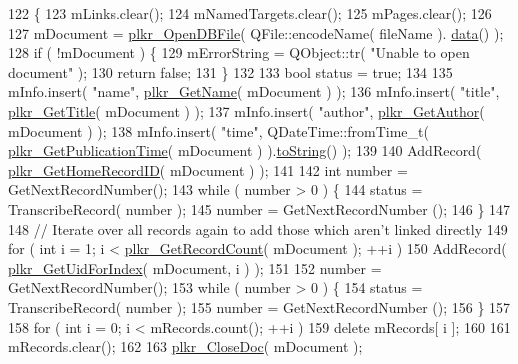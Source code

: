 \begin{DoxyCode}
122 \{
123     mLinks.clear();
124     mNamedTargets.clear();
125     mPages.clear();
126 
127     mDocument = \hyperlink{unpluck_8cpp_a38de1e8e97b764ccca414cf11e08dc61}{plkr\_OpenDBFile}( QFile::encodeName( fileName ).
      \hyperlink{structdrawinf_af73f66288002f0a25c7843a534bf1340}{data}() );
128     \textcolor{keywordflow}{if} ( !mDocument ) \{
129         mErrorString = QObject::tr( \textcolor{stringliteral}{"Unable to open document"} );
130         \textcolor{keywordflow}{return} \textcolor{keyword}{false};
131     \}
132 
133     \textcolor{keywordtype}{bool} status = \textcolor{keyword}{true};
134 
135     mInfo.insert( \textcolor{stringliteral}{"name"}, \hyperlink{unpluck_8cpp_adb65e4c54851ce85120ea90c26b07fe7}{plkr\_GetName}( mDocument ) );
136     mInfo.insert( \textcolor{stringliteral}{"title"}, \hyperlink{unpluck_8cpp_a8d84299a17aad8c4bb6d4767010fbf08}{plkr\_GetTitle}( mDocument ) );
137     mInfo.insert( \textcolor{stringliteral}{"author"}, \hyperlink{unpluck_8cpp_a45d4ff9de35c9fe8a8e36760e71a9992}{plkr\_GetAuthor}( mDocument ) );
138     mInfo.insert( \textcolor{stringliteral}{"time"}, QDateTime::fromTime\_t( \hyperlink{unpluck_8cpp_a4531d6236359aa5e52b27032285d86e1}{plkr\_GetPublicationTime}( mDocument 
      ) ).\hyperlink{namespaceQTest_a861302f3f44f1ae8461d2752a3e3813c}{toString}() );
139 
140     AddRecord( \hyperlink{unpluck_8cpp_a8b6f0c5a537f337b35883623bb57a903}{plkr\_GetHomeRecordID}( mDocument ) );
141 
142     \textcolor{keywordtype}{int} number = GetNextRecordNumber();
143     \textcolor{keywordflow}{while} ( number > 0 ) \{
144         status = TranscribeRecord( number );
145         number = GetNextRecordNumber ();
146     \}
147 
148     \textcolor{comment}{// Iterate over all records again to add those which aren't linked directly}
149     \textcolor{keywordflow}{for} ( \textcolor{keywordtype}{int} i = 1; i < \hyperlink{unpluck_8cpp_a491631322face4b090e9648f6e8f4e88}{plkr\_GetRecordCount}( mDocument ); ++i )
150         AddRecord( \hyperlink{unpluck_8cpp_ad72da860facf37f9ac7b14eedc1d7d77}{plkr\_GetUidForIndex}( mDocument, i ) );
151 
152     number = GetNextRecordNumber();
153     \textcolor{keywordflow}{while} ( number > 0 ) \{
154         status = TranscribeRecord( number );
155         number = GetNextRecordNumber ();
156     \}
157 
158     \textcolor{keywordflow}{for} ( \textcolor{keywordtype}{int} i = 0; i < mRecords.count(); ++i )
159         \textcolor{keyword}{delete} mRecords[ i ];
160 
161     mRecords.clear();
162 
163     \hyperlink{unpluck_8cpp_a22eef807fefa1151ce30759bd0b657fe}{plkr\_CloseDoc}( mDocument );

\end{DoxyCode}
